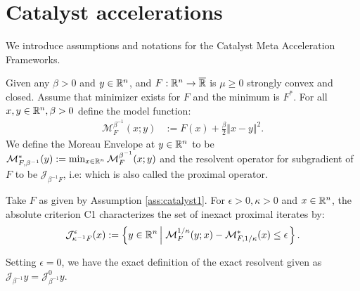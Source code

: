 \documentclass[12pt]{article}
\begin{document}

\section{Catalyst accelerations}\label{sec:catalyst}
    We introduce assumptions and notations for the Catalyst Meta Acceleration Frameworks. 
    \begin{assumption}\label{ass:catalyst1}
        Given any $\beta > 0$ and $y \in \mathbb R^n$, and $F: \mathbb R^n\rightarrow \overline {\mathbb R}$ is $\mu \ge 0$ strongly convex and closed. 
        Assume that minimizer exists for $F$ and the minimum is $F^*$. 
        For all $x,y\in \mathbb R^n, \beta > 0$ define the model function: 
        \begin{align*}
            \mathcal M^{\beta^{-1}}_F(x; y) &:= 
            F(x) + \frac{\beta}{2}\Vert x - y\Vert^2.
        \end{align*}
        We define the Moreau Envelope at $y \in \mathbb R^n$ to be $\mathcal M^*_{F,\beta^{-1}}(y) := \min_{x\in \mathbb R^n} \mathcal M_F^{\beta^{-1}}(x; y)$ and the resolvent operator for subgradient of $F$ to be $\mathcal J_{\beta^{-1}F}$, i.e: which is also called the proximal operator. 
    \end{assumption}
    \begin{definition}\label{def:catalyst-termination-c1}
        Take $F$ as given by Assumption \ref{ass:catalyst1}.
        For $\epsilon > 0, \kappa > 0$ and $x \in \mathbb R^n$, the absolute criterion C1 characterizes the set of inexact proximal iterates by: 
        \begin{align*}
            \mathcal J_{\kappa^{-1} F}^\epsilon (x) := 
            \left\lbrace
                y \in \mathbb R^n \left | \; 
                        \mathcal M^{1/\kappa}_F (y; x) - 
                        \mathcal M^*_{F, 1/\kappa}(x) \le \epsilon
                \right.
            \right\rbrace. 
        \end{align*}
    \end{definition}
    \begin{remark}
        Setting $\epsilon = 0$, we have the exact definition of the exact resolvent given as $\mathcal J_{\beta^{-1}}y = \mathcal J^0_{\beta^{-1}}y$. 
    \end{remark}
\end{document}
